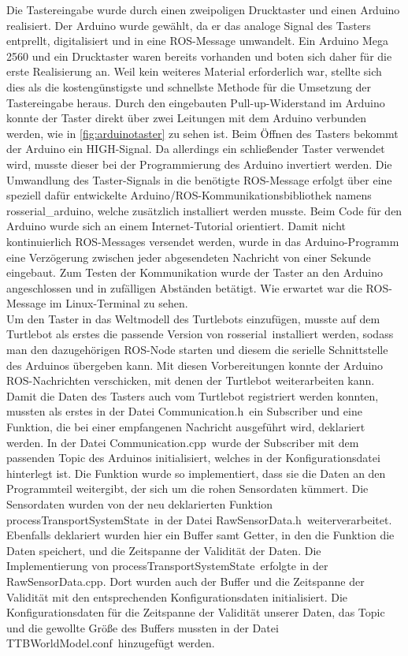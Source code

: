 \documentclass[a4paper,12pt,headsepline]{scrartcl}
\begin{document}
	Die Tastereingabe wurde durch einen zweipoligen Drucktaster und einen Arduino realisiert. Der Arduino wurde gewählt, da er das analoge Signal des Tasters entprellt, digitalisiert und in eine ROS-Message umwandelt. Ein Arduino Mega 2560 und ein Drucktaster waren bereits vorhanden und boten sich daher für die erste Realisierung an. Weil kein weiteres Material erforderlich war, stellte sich dies als die kostengünstigste und schnellste Methode für die Umsetzung der Tastereingabe heraus. Durch den eingebauten Pull-up-Widerstand im Arduino konnte der Taster direkt über zwei Leitungen mit dem Arduino verbunden werden, wie in \cref{fig:arduinotaster} zu sehen ist. Beim Öffnen des Tasters bekommt der Arduino ein HIGH-Signal. Da allerdings ein schließender Taster verwendet wird, musste dieser bei der Programmierung des Arduino invertiert werden. Die Umwandlung des Taster-Signals in die benötigte ROS-Message erfolgt über eine speziell dafür entwickelte Arduino/ROS-Kommunikationsbibliothek namens \glqq rosserial\_arduino\grqq, welche zusätzlich installiert werden musste. Beim Code für den Arduino wurde sich an einem Internet-Tutorial orientiert. Damit nicht kontinuierlich ROS-Messages versendet werden, wurde in das Arduino-Programm eine Verzögerung zwischen jeder abgesendeten Nachricht von einer Sekunde eingebaut. Zum Testen der Kommunikation wurde der Taster an den Arduino angeschlossen und in zufälligen Abständen betätigt. Wie erwartet war die ROS-Message im Linux-Terminal zu sehen.\\
Um den Taster in das Weltmodell des Turtlebots einzufügen, musste auf dem Turtlebot als erstes die passende Version von \glqq rosserial\grqq\ installiert werden, sodass man den dazugehörigen ROS-Node starten und diesem die serielle Schnittstelle des Arduinos übergeben kann. Mit diesen Vorbereitungen konnte der Arduino ROS-Nachrichten verschicken, mit denen der Turtlebot weiterarbeiten kann. Damit die Daten des Tasters auch vom Turtlebot registriert werden konnten, mussten als erstes in der Datei \glqq Communication.h\grqq\ ein Subscriber und eine Funktion, die bei einer empfangenen Nachricht ausgeführt wird, deklariert werden. In der Datei \glqq Communication.cpp\grqq\ wurde der Subscriber mit dem passenden Topic des Arduinos initialisiert, welches in der Konfigurationsdatei hinterlegt ist. Die Funktion wurde so implementiert, dass sie die Daten an den Programmteil weitergibt, der sich um die rohen Sensordaten kümmert. Die Sensordaten wurden von der neu deklarierten Funktion \glqq processTransportSystemState\grqq\ in der Datei \glqq RawSensorData.h\grqq\ weiterverarbeitet. Ebenfalls deklariert wurden hier ein Buffer samt Getter, in den die Funktion die Daten speichert, und die Zeitspanne der Validität der Daten. Die Implementierung von \glqq processTransportSystemState\grqq\ erfolgte in der \glqq RawSensorData.cpp\grqq. Dort wurden auch der Buffer und die Zeitspanne der Validität mit den entsprechenden Konfigurationsdaten initialisiert. Die Konfigurationsdaten für die Zeitspanne der Validität unserer Daten, das Topic und die gewollte Größe des Buffers mussten in der Datei \glqq TTBWorldModel.conf\grqq\ hinzugefügt werden.\\
\end{document}
